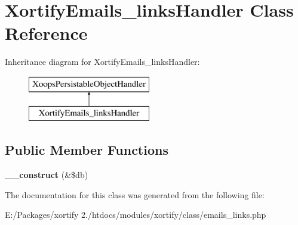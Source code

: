 \hypertarget{class_xortify_emails__links_handler}{\section{Xortify\-Emails\-\_\-links\-Handler Class Reference}
\label{class_xortify_emails__links_handler}
}
Inheritance diagram for Xortify\-Emails\-\_\-links\-Handler\-:\begin{figure}[H]
\begin{center}
\leavevmode
\includegraphics[height=2.000000cm]{class_xortify_emails__links_handler}
\end{center}
\end{figure}
\subsection*{Public Member Functions}
\begin{DoxyCompactItemize}
\item 
\hypertarget{class_xortify_emails__links_handler_a99d724c32072c717f8d0dd2158b93ea0}{{\bfseries \-\_\-\-\_\-construct} (\&\$db)}\label{class_xortify_emails__links_handler_a99d724c32072c717f8d0dd2158b93ea0}

\end{DoxyCompactItemize}


The documentation for this class was generated from the following file\-:\begin{DoxyCompactItemize}
\item 
E\-:/\-Packages/xortify 2./htdocs/modules/xortify/class/emails\-\_\-links.\-php\end{DoxyCompactItemize}
